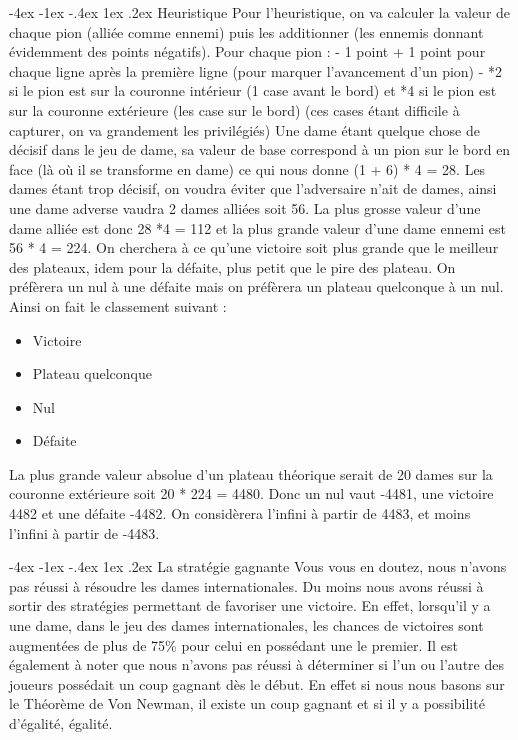 \documentclass[a4paper]{article}
\makeatletter
\renewcommand{\section}{\@startsection{section}{1}{\z@}
{-4ex \@plus -1ex \@minus -.4ex}
{1ex \@plus.2ex }
{\normalfont\large\sffamily\bfseries}}
\makeatother
\begin{document}
\section{Heuristique}
Pour l’heuristique, on va calculer la valeur de chaque pion (alliée comme ennemi) puis les additionner (les ennemis donnant évidemment des points négatifs).
Pour chaque pion :
- 1 point + 1 point pour chaque ligne après la première ligne (pour marquer l’avancement d’un pion)
- *2 si le pion est sur la couronne intérieur (1 case avant le bord) et *4 si le pion est sur la couronne extérieure (les case sur le bord) (ces cases étant difficile à capturer, on va grandement les privilégiés)
Une dame étant quelque chose de décisif dans le jeu de dame, sa valeur de base correspond à un pion sur le bord en face (là où il se transforme en dame) ce qui nous donne (1 + 6) * 4 = 28.
Les dames étant trop décisif, on voudra éviter que l’adversaire n’ait de dames, ainsi une dame adverse vaudra 2 dames alliées soit 56.
La plus grosse valeur d’une dame alliée est donc 28 *4 = 112 et la plus grande valeur d’une dame ennemi est 56 * 4 = 224.
On cherchera à ce qu’une victoire soit plus grande que le meilleur des plateaux, idem pour la défaite, plus petit que le pire des plateau. On préfèrera un nul à une défaite mais on préfèrera un plateau quelconque à un nul.
Ainsi on fait le classement suivant :
\begin{itemize}
\item Victoire
\item Plateau quelconque
\item Nul
\item Défaite
\end{itemize}
La plus grande valeur absolue d’un plateau théorique serait de 20 dames sur la couronne extérieure soit 20 * 224 = 4480.
Donc un nul vaut -4481, une victoire 4482 et une défaite -4482.
On considèrera l’infini à partir de 4483, et moins l’infini à partir de -4483.

\section{La stratégie gagnante}
Vous vous en doutez, nous n'avons pas réussi à résoudre les dames internationales. Du moins nous avons réussi à sortir des stratégies permettant de favoriser une victoire. En effet, lorsqu'il y a une dame, dans le jeu des dames internationales, les chances de victoires sont augmentées de plus de 75\% pour celui en possédant une le premier. Il est également à noter que nous n'avons pas réussi à déterminer si l'un ou l'autre des joueurs possédait un coup gagnant dès le début. En effet si nous nous basons sur le Théorème de Von Newman, il existe un coup gagnant et si il y a possibilité d'égalité, égalité.
\end{document}
